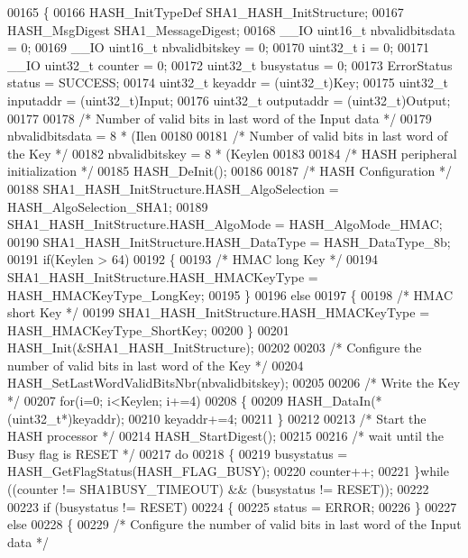 \begin{DoxyCode}
00165 \{
00166   HASH_InitTypeDef SHA1\_HASH\_InitStructure;
00167   HASH_MsgDigest SHA1\_MessageDigest;
00168   \_\_IO uint16\_t nbvalidbitsdata = 0;
00169   \_\_IO uint16\_t nbvalidbitskey = 0;
00170   uint32\_t i = 0;
00171   \_\_IO uint32\_t counter = 0;
00172   uint32\_t busystatus = 0;
00173   ErrorStatus status = SUCCESS;
00174   uint32\_t keyaddr    = (uint32\_t)Key;
00175   uint32\_t inputaddr  = (uint32\_t)Input;
00176   uint32\_t outputaddr = (uint32\_t)Output;
00177 
00178   \textcolor{comment}{/* Number of valid bits in last word of the Input data */}
00179   nbvalidbitsdata = 8 * (Ilen %
00180 
00181   \textcolor{comment}{/* Number of valid bits in last word of the Key */}
00182   nbvalidbitskey = 8 * (Keylen %
00183 
00184   \textcolor{comment}{/* HASH peripheral initialization */}
00185   HASH_DeInit();
00186 
00187   \textcolor{comment}{/* HASH Configuration */}
00188   SHA1\_HASH\_InitStructure.HASH_AlgoSelection = HASH_AlgoSelection_SHA1;
00189   SHA1\_HASH\_InitStructure.HASH_AlgoMode = HASH_AlgoMode_HMAC;
00190   SHA1\_HASH\_InitStructure.HASH_DataType = HASH_DataType_8b;
00191   \textcolor{keywordflow}{if}(Keylen > 64)
00192   \{
00193     \textcolor{comment}{/* HMAC long Key */}
00194     SHA1\_HASH\_InitStructure.HASH_HMACKeyType = HASH_HMACKeyType_LongKey;
00195   \}
00196   \textcolor{keywordflow}{else}
00197   \{
00198     \textcolor{comment}{/* HMAC short Key */}
00199     SHA1\_HASH\_InitStructure.HASH_HMACKeyType = HASH_HMACKeyType_ShortKey;
00200   \}
00201   HASH_Init(&SHA1\_HASH\_InitStructure);
00202 
00203   \textcolor{comment}{/* Configure the number of valid bits in last word of the Key */}
00204   HASH_SetLastWordValidBitsNbr(nbvalidbitskey);
00205 
00206   \textcolor{comment}{/* Write the Key */}
00207   \textcolor{keywordflow}{for}(i=0; i<Keylen; i+=4)
00208   \{
00209     HASH_DataIn(*(uint32\_t*)keyaddr);
00210     keyaddr+=4;
00211   \}
00212 
00213   \textcolor{comment}{/* Start the HASH processor */}
00214   HASH_StartDigest();
00215 
00216   \textcolor{comment}{/* wait until the Busy flag is RESET */}
00217   \textcolor{keywordflow}{do}
00218   \{
00219     busystatus = HASH_GetFlagStatus(HASH_FLAG_BUSY);
00220     counter++;
00221   \}\textcolor{keywordflow}{while} ((counter != SHA1BUSY_TIMEOUT) && (busystatus != RESET));
00222 
00223   \textcolor{keywordflow}{if} (busystatus != RESET)
00224   \{
00225      status = ERROR;
00226   \}
00227   \textcolor{keywordflow}{else}
00228   \{
00229     \textcolor{comment}{/* Configure the number of valid bits in last word of the Input data */}

\end{DoxyCode}
